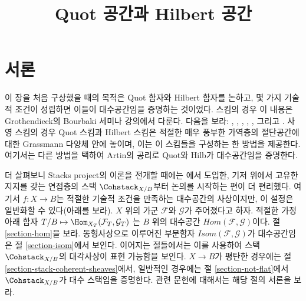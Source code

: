 



\title{Quot 공간과 Hilbert 공간}

\maketitle

\label{section-phantom}

\tableofcontents




\section{서론}
\label{section-introduction}

\noindent
이 장을 처음 구상했을 때의 목적은 Quot 함자와 Hilbert 함자를 논하고,
몇 가지 기술적 조건이 성립하면 이들이 대수공간임을 증명하는 것이었다.
스킴의 경우 이 내용은 Grothendieck의 Bourbaki 세미나 강의에서 다룬다.
다음을 보라:
\cite{Gr-I},
\cite{Gr-II},
\cite{Gr-III},
\cite{Gr-IV},
\cite{Gr-V}, 그리고
\cite{Gr-VI}. 사영 스킴의 경우 Quot 스킴과 Hilbert 스킴은 적절한
매우 풍부한 가역층의 절단공간에 대한 Grassmann 다양체 안에 놓이며,
이는 이 스킴들을 구성하는 한 방법을 제공한다. 여기서는 다른 방법을
택하여 Artin의 공리로 Quot와 Hilb가 대수공간임을 증명한다.

\medskip\noindent
더 살펴보니 Stacks project의 이론을 전개할 때에는
\cite{lieblich_remarks}에서 도입한, 기저 위에서 고유한 지지를 갖는
연접층의 스택 $\Cohstack_{X/B}$부터 논의를 시작하는 편이 더 편리했다.
여기서 $f : X \to B$는 적절한 기술적 조건을 만족하는 대수공간의
사상이지만, 이 설정은 일반화할 수 있다(아래를 보라).
$X$ 위의 가군 $\mathcal{F}$와 $\mathcal{G}$가 주어졌다고 하자.
적절한 가정 아래 함자
$T/B \mapsto \Hom_{X_T}(\mathcal{F}_T, \mathcal{G}_T)$
는 $B$ 위의 대수공간 $\mathit{Hom}(\mathcal{F}, \mathcal{G})$이다.
절 \ref{section-hom}을 보라. 동형사상으로 이루어진 부분함자
$\mathit{Isom}(\mathcal{F}, \mathcal{G})$가 대수공간임은
절 \ref{section-isom}에서 보인다. 이어지는 절들에서는 이를 사용하여
스택 $\Cohstack_{X/B}$의 대각사상이 표현 가능함을 보인다.
$X \to B$가 평탄한 경우에는 절 \ref{section-stack-coherent-sheaves}에서,
일반적인 경우에는 절 \ref{section-not-flat}에서
$\Cohstack_{X/B}$가 대수 스택임을 증명한다.
관련 문헌에 대해서는 해당 절의 서론을 보라.

